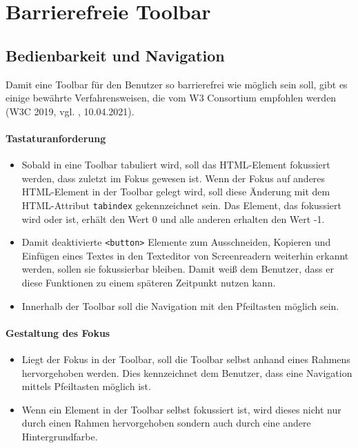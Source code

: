 \section{Barrierefreie Toolbar}
\subsection{Bedienbarkeit und Navigation}
Damit eine Toolbar für den Benutzer so barrierefrei wie möglich sein soll, gibt es einige bewährte Verfahrensweisen, 
die vom W3 Consortium empfohlen werden (W3C 2019, vgl. \cite{accessible_toolbar_2020}, 10.04.2021).

\paragraph{Tastaturanforderung}

\begin{itemize}
	\item Sobald in eine Toolbar tabuliert wird, soll das HTML-Element fokussiert werden, dass zuletzt im Fokus 
		gewesen ist. Wenn der Fokus auf anderes HTML-Element in der Toolbar gelegt wird, soll diese 
		Änderung mit dem HTML-Attribut \texttt{tabindex} gekennzeichnet sein. Das Element, das fokussiert wird 	
		oder ist, erhält den Wert 0 und alle anderen erhalten den Wert -1.
	\item Damit deaktivierte \texttt{<button>} Elemente zum Ausschneiden, Kopieren und Einfügen eines Textes in 
		den Texteditor von Screenreadern weiterhin erkannt werden, sollen sie fokussierbar bleiben. Damit weiß
		dem Benutzer, dass er diese Funktionen zu einem späteren Zeitpunkt nutzen kann.
	\item Innerhalb der Toolbar soll die Navigation mit den Pfeiltasten möglich sein. 
\end{itemize}

\paragraph{Gestaltung des Fokus}

\begin{itemize}
	\item Liegt der Fokus in der Toolbar, soll die Toolbar selbst anhand eines Rahmens hervorgehoben werden. Dies
		kennzeichnet dem Benutzer, dass eine Navigation mittels Pfeiltasten möglich ist.
	\item Wenn ein Element in der Toolbar selbst fokussiert ist, wird dieses nicht nur durch einen Rahmen 	
		hervorgehoben sondern auch durch eine andere Hintergrundfarbe.
\end{itemize}

